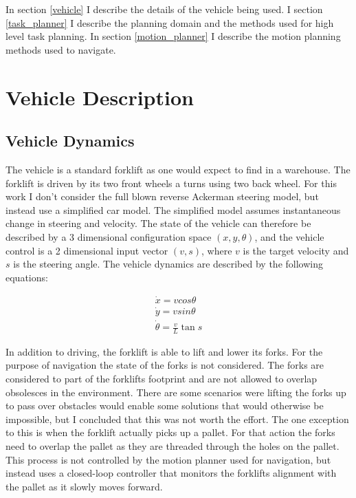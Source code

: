 \documentclass[letterpaper, 10 pt, conference]{ieeeconf}  %
\begin{document}
In section \ref{vehicle} I describe the details of the vehicle being used. I section \ref{task_planner} I describe the planning domain and the methods used for high level task planning. In section \ref{motion_planner} I describe the motion planning methods used to navigate. 

\label{vehicle}
\section{Vehicle Description}

\subsection{Vehicle Dynamics}
The vehicle is a standard forklift as one would expect to find in a warehouse. The forklift is driven by its two front wheels a turns using two back wheel. For this work I don't consider the full blown reverse Ackerman steering model, but instead use a simplified car model. The simplified model assumes instantaneous change in steering and velocity. The state of the vehicle can therefore be described by a 3 dimensional configuration space $(x, y, \theta)$, and the vehicle control is a 2 dimensional input vector $(v, s)$, where $v$ is the target velocity and $s$ is the steering angle.
The vehicle dynamics are described by the following equations:

\begin{align}
	\dot{x}	= v cos \theta \\ 
	\dot{y}	= v sin \theta \\
	\dot{\theta} = \frac{v}{L} \tan s
\end{align}

In addition to driving, the forklift is able to lift and lower its forks. For the purpose of navigation the state of the forks is not considered. The forks are considered to part of the forklifts footprint and are not allowed to overlap obsolesces in the environment. There are some scenarios were lifting the forks up to pass over obstacles would enable some solutions that would otherwise be impossible, but I concluded that this was not worth the effort. The one exception to this is when the forklift actually picks up a pallet. For that action the forks need to overlap the pallet as they are threaded through the holes on the pallet. This process is not controlled by the motion planner used for navigation, but instead uses a closed-loop controller that monitors the forklifts alignment with the pallet as it slowly moves forward.
\end{document}
